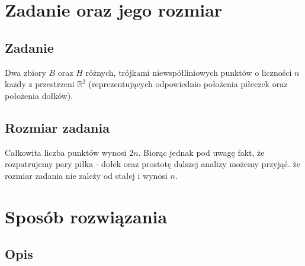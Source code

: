 \documentclass[10pt,a4paper]{article}
\begin{document}
	\section{Zadanie oraz jego rozmiar}
	
	\subsection{Zadanie}
	Dwa zbiory $B$ oraz $H$ różnych, trójkami niewspółliniowych punktów o liczności $n$ każdy z przestrzeni $\mathbb{R}^{2}$ (reprezentujących odpowiednio położenia piłeczek oraz położenia dołków).
	
	\subsection{Rozmiar zadania}
	
	Całkowita liczba punktów wynosi $2n$. Biorąc jednak pod uwagę fakt, że rozpatrujemy pary piłka - dołek oraz prostotę dalszej analizy możemy przyjąć. że rozmiar zadania nie zależy od stałej i wynosi $n$.
	
	\section{Sposób rozwiązania}
	
	\subsection{Opis}
	
\end{document}
